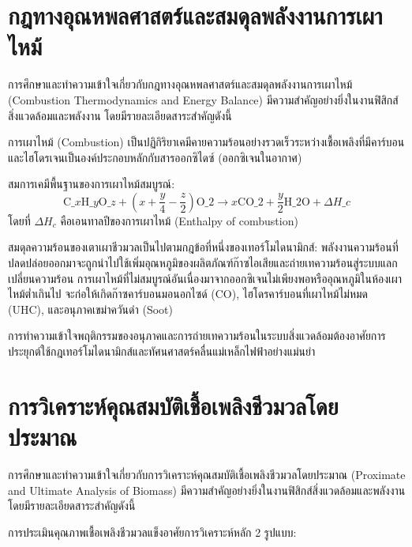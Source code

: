 
\section{กฎทางอุณหพลศาสตร์และสมดุลพลังงานการเผาไหม้}

การศึกษาและทำความเข้าใจเกี่ยวกับกฎทางอุณหพลศาสตร์และสมดุลพลังงานการเผาไหม้ (Combustion Thermodynamics and Energy Balance) มีความสำคัญอย่างยิ่งในงานฟิสิกส์สิ่งแวดล้อมและพลังงาน โดยมีรายละเอียดสาระสำคัญดังนี้

การเผาไหม้ (Combustion) เป็นปฏิกิริยาเคมีคายความร้อนอย่างรวดเร็วระหว่างเชื้อเพลิงที่มีคาร์บอนและไฮโดรเจนเป็นองค์ประกอบหลักกับสารออกซิไดซ์ (ออกซิเจนในอากาศ)

สมการเคมีพื้นฐานของการเผาไหม้สมบูรณ์:
\[ \text{C}\_x\text{H}\_y\text{O}\_z + \left(x + \frac{y}{4} - \frac{z}{2}\right) \text{O}\_2 \rightarrow x\text{CO}\_2 + \frac{y}{2}\text{H}\_2\text{O} + \Delta H\_c \]
โดยที่ $\Delta H_c$ คือเอนทาลปีของการเผาไหม้ (Enthalpy of combustion)

สมดุลความร้อนของเตาเผาชีวมวลเป็นไปตามกฎข้อที่หนึ่งของเทอร์โมไดนามิกส์: พลังงานความร้อนที่ปลดปล่อยออกมาจะถูกนำไปใช้เพิ่มอุณหภูมิของผลิตภัณฑ์ก๊าซไอเสียและถ่ายเทความร้อนสู่ระบบแลกเปลี่ยนความร้อน การเผาไหม้ที่ไม่สมบูรณ์อันเนื่องมาจากออกซิเจนไม่เพียงพอหรืออุณหภูมิในห้องเผาไหม้ต่ำเกินไป จะก่อให้เกิดก๊าซคาร์บอนมอนอกไซด์ (CO), ไฮโดรคาร์บอนที่เผาไหม้ไม่หมด (UHC), และอนุภาคเขม่าควันดำ (Soot)

\begin{physbox}
การทำความเข้าใจพฤติกรรมของอนุภาคและการถ่ายเทความร้อนในระบบสิ่งแวดล้อมต้องอาศัยการประยุกต์ใช้กฎเทอร์โมไดนามิกส์และทัศนศาสตร์คลื่นแม่เหล็กไฟฟ้าอย่างแม่นยำ
\end{physbox}

\section{การวิเคราะห์คุณสมบัติเชื้อเพลิงชีวมวลโดยประมาณ}

การศึกษาและทำความเข้าใจเกี่ยวกับการวิเคราะห์คุณสมบัติเชื้อเพลิงชีวมวลโดยประมาณ (Proximate and Ultimate Analysis of Biomass) มีความสำคัญอย่างยิ่งในงานฟิสิกส์สิ่งแวดล้อมและพลังงาน โดยมีรายละเอียดสาระสำคัญดังนี้

การประเมินคุณภาพเชื้อเพลิงชีวมวลแข็งอาศัยการวิเคราะห์หลัก 2 รูปแบบ:

